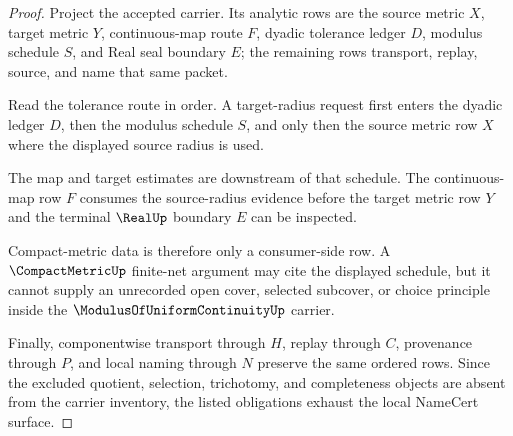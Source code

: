 \begin{proof}
Project the accepted carrier. Its analytic rows are the source metric $X$, target metric $Y$, continuous-map route $F$, dyadic tolerance ledger $D$, modulus schedule $S$, and Real seal boundary $E$; the remaining rows transport, replay, source, and name that same packet.

Read the tolerance route in order. A target-radius request first enters the dyadic ledger $D$, then the modulus schedule $S$, and only then the source metric row $X$ where the displayed source radius is used.

The map and target estimates are downstream of that schedule. The continuous-map row $F$ consumes the source-radius evidence before the target metric row $Y$ and the terminal $\RealUp$ boundary $E$ can be inspected.

Compact-metric data is therefore only a consumer-side row. A $\CompactMetricUp$ finite-net argument may cite the displayed schedule, but it cannot supply an unrecorded open cover, selected subcover, or choice principle inside the $\ModulusOfUniformContinuityUp$ carrier.

Finally, componentwise transport through $H$, replay through $C$, provenance through $P$, and local naming through $N$ preserve the same ordered rows. Since the excluded quotient, selection, trichotomy, and completeness objects are absent from the carrier inventory, the listed obligations exhaust the local NameCert surface.
\end{proof}


\begin{closurestatus}{\ModulusOfUniformContinuityUp}
  \theoryclosure{\seedClosure}
  \formalstatus{\unformalizedV}
\end{closurestatus}

